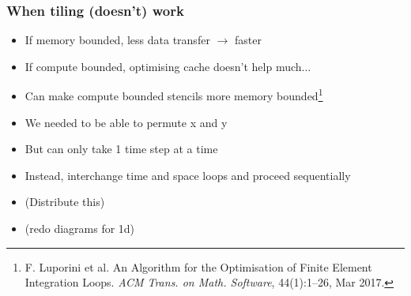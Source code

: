 \documentclass{beamer}
\begin{document}
%
%
%
%



\begin{frame}
\frametitle{When tiling (doesn't) work}

\begin{itemize}
	\item If memory bounded, less data transfer \(\rightarrow\) faster
	\item If compute bounded, optimising cache doesn't help much...
	\item Can make compute bounded stencils more memory bounded\footnote{F. Luporini et al. An Algorithm for the Optimisation of Finite Element Integration Loops. \emph{ACM Trans. on Math. Software}, 44(1):1--26, Mar 2017.}
	\newline
	\item We needed to be able to permute x and y
	\item But can only take 1 time step at a time
	\item Instead, interchange time and space loops and proceed sequentially
	\item (Distribute this)
	\item (redo diagrams for 1d)
\end{itemize}
\end{frame}
\end{document}
